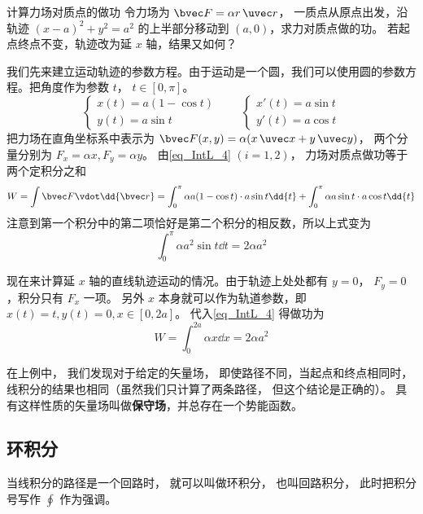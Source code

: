 \begin{example}{计算力场对质点的做功}\label{ex_IntL_1}
令力场为 $\bvec F = \alpha r \,\uvec r$， 一质点从原点出发，沿轨迹 $(x-a)^2 + y^2 = a^2$ 的上半部分移动到 $(a,0)$，求力对质点做的功。 若起点终点不变，轨迹改为延 $x$ 轴，结果又如何？

我们先来建立运动轨迹的参数方程。由于运动是一个圆，我们可以使用圆的参数方程。把角度作为参数 $t$， $t\in [0,\pi]$。
\begin{equation}
\begin{cases}
x(t) = a(1-\cos t)\\
y(t) = a \sin t
\end{cases}
\qquad 
\begin{cases}
x'(t) = a \sin t\\
y'(t) = a \cos t
\end{cases}
\end{equation}
把力场在直角坐标系中表示为 $\bvec F(x,y) = \alpha (x\,\uvec x + y\,\uvec y)$， 两个分量分别为 $F_x = \alpha x, F_y = \alpha y$。 由\autoref{eq_IntL_4} $(i=1,2)$， 力场对质点做功等于两个定积分之和
\begin{equation}
W = \int \bvec F \vdot \dd{\bvec r} =\int_0^\pi \alpha a(1-\cos t) \cdot a \sin t \dd{t} + \int_0^\pi \alpha a \sin t \cdot a \cos t \dd{t}
\end{equation}
注意到第一个积分中的第二项恰好是第二个积分的相反数，所以上式变为
\begin{equation}
\int_0^\pi \alpha a^2 \sin t \dd{t} =2 \alpha a^2
\end{equation}

现在来计算延 $x$ 轴的直线轨迹运动的情况。由于轨迹上处处都有 $y=0$， $F_y = 0$，积分只有 $F_x$ 一项。 另外 $x$ 本身就可以作为轨道参数，即 $x(t) = t, y(t) = 0, x\in [0, 2a]$。 代入\autoref{eq_IntL_4} 得做功为
\begin{equation}
W = \int_0^{2a} \alpha x \dd{x} = 2 \alpha a^2
\end{equation}
\end{example}

在上例中， 我们发现对于给定的矢量场， 即使路径不同，当起点和终点相同时， 线积分的结果也相同（虽然我们只计算了两条路径， 但这个结论是正确的）。 具有这样性质的矢量场叫做\textbf{保守场}，并总存在一个势能函数。 

\subsection{环积分}

当线积分的路径是一个回路时， 就可以叫做环积分， 也叫回路积分， 此时把积分号写作 $\oint$ 作为强调。

